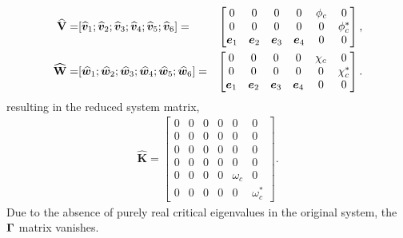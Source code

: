  \begin{align}
 	\mathbf{\widehat{V}} =& [{\widehat{\boldsymbol{v}}}_{1};{\widehat{\boldsymbol{v}}}_{2};{\widehat{\boldsymbol{v}}}_{3};{\widehat{\boldsymbol{v}}}_{4};{\widehat{\boldsymbol{v}}}_{5};{\widehat{\boldsymbol{v}}}_{6}] =&
 	\begin{bmatrix}
        0 	    	      &  0		            &  0              &  0              &  \phi_{c} &  0              \\
        0		      &  0		            &  0              &  0              &  0        &  \phi^{*}_{c}   \\
 	  \boldsymbol{e}_{1}  &  \boldsymbol{e}_{2}       &  \boldsymbol{e}_{3} &  \boldsymbol{e}_{4} &  0        &  0              \\
 	\end{bmatrix}, \nonumber \\
 	\mathbf{\widehat{W}} =&
 	[{\widehat{\boldsymbol{w}}}_{1};{\widehat{\boldsymbol{w}}}_{2};{\widehat{\boldsymbol{w}}}_{3};{\widehat{\boldsymbol{w}}}_{4};{\widehat{\boldsymbol{w}}}_{5};{\widehat{\boldsymbol{w}}}_{6}] =&
 	\begin{bmatrix}
        0 	    	      &  0		            &  0              &  0              &  \chi_{c} &  0              \\
        0		      &  0		            &  0              &  0              &  0        &  \chi^{*}_{c}   \\
 	  \boldsymbol{e}_{1}  &  \boldsymbol{e}_{2}       &  \boldsymbol{e}_{3} &  \boldsymbol{e}_{4} &  0        &  0              \\
 	\end{bmatrix}. \nonumber
 \end{align}
resulting in the reduced system matrix,
\begin{align}
	\mathbf{\widehat{K}} = \begin{bmatrix}
		0 & 0 & 0 & 0 & 0& 0 \\ 
		0 & 0 & 0 & 0 & 0& 0 \\ 
		0 & 0 & 0 & 0 & 0& 0 \\ 
		0 & 0 & 0 & 0 & 0& 0 \\ 
		0 & 0 & 0 & 0 & \omega_{c} & 0 \\ 
		0 & 0 & 0 & 0 & 0 & \omega^{*}_{c}
	\end{bmatrix}. \nonumber
\end{align}
Due to the absence of purely real critical eigenvalues in the original system, the $\mathbf{\Gamma}$ matrix vanishes. 

